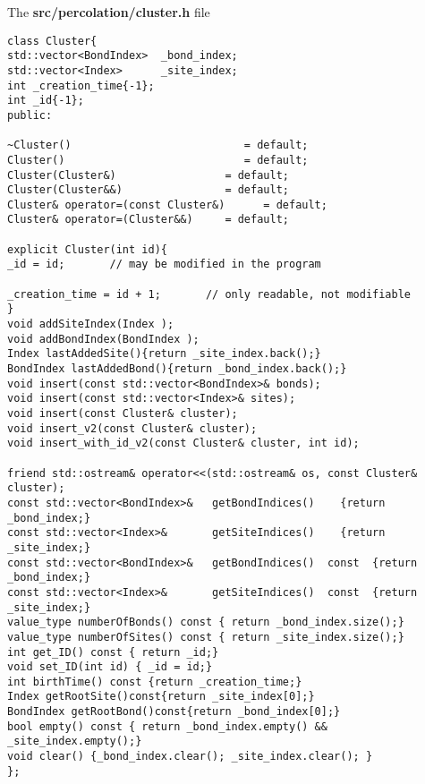 
The \textbf{src/percolation/cluster.h} file

\begin{lstlisting}[style=CStyle]
class Cluster{
std::vector<BondIndex>  _bond_index; 
std::vector<Index>      _site_index; 
int _creation_time{-1};  
int _id{-1};
public:

~Cluster()                           = default;
Cluster()                            = default;
Cluster(Cluster&)                 = default;
Cluster(Cluster&&)                = default;
Cluster& operator=(const Cluster&)      = default;
Cluster& operator=(Cluster&&)     = default;

explicit Cluster(int id){
_id = id;       // may be modified in the program

_creation_time = id + 1;       // only readable, not modifiable
}
void addSiteIndex(Index );
void addBondIndex(BondIndex );
Index lastAddedSite(){return _site_index.back();}
BondIndex lastAddedBond(){return _bond_index.back();}
void insert(const std::vector<BondIndex>& bonds);
void insert(const std::vector<Index>& sites);
void insert(const Cluster& cluster);
void insert_v2(const Cluster& cluster);
void insert_with_id_v2(const Cluster& cluster, int id);

friend std::ostream& operator<<(std::ostream& os, const Cluster& cluster);
const std::vector<BondIndex>&   getBondIndices()    {return _bond_index;}
const std::vector<Index>&       getSiteIndices()    {return _site_index;}
const std::vector<BondIndex>&   getBondIndices()  const  {return _bond_index;}
const std::vector<Index>&       getSiteIndices()  const  {return _site_index;}
value_type numberOfBonds() const { return _bond_index.size();}
value_type numberOfSites() const { return _site_index.size();}
int get_ID() const { return _id;}
void set_ID(int id) { _id = id;}
int birthTime() const {return _creation_time;}
Index getRootSite()const{return _site_index[0];} 
BondIndex getRootBond()const{return _bond_index[0];} 
bool empty() const { return _bond_index.empty() && _site_index.empty();}
void clear() {_bond_index.clear(); _site_index.clear(); }
};
\end{lstlisting}

